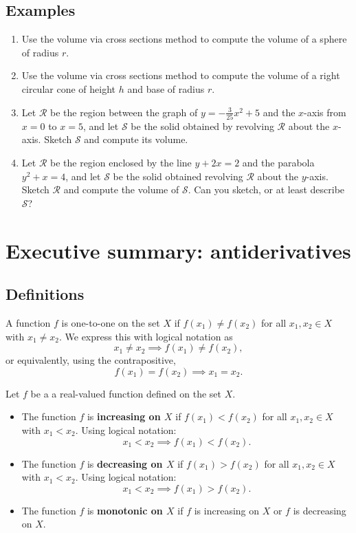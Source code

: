 \subsection*{Examples}
\begin{enumerate}
  \item Use the volume via cross sections method to compute the volume of a sphere of radius $r$.
  \item Use the volume via cross sections method to compute the volume of a right circular cone of height $h$ and base of radius $r$.
  \item Let $\mathcal{R}$ be the region between the graph of $y=-\frac{3}{25}x^2+5$ and the $x$-axis from $x=0$ to $x=5$, and let $\mathcal{S}$ be the solid obtained by revolving $\mathcal{R}$ about the $x$-axis. Sketch $\mathcal{S}$ and compute its volume.
  \item Let $\mathcal{R}$ be the region enclosed by the line $y+2x=2$ and the parabola $y^2+x=4$, and let $\mathcal{S}$ be the solid obtained revolving $\mathcal{R}$ about the $y$-axis. Sketch $\mathcal{R}$ and compute the volume of $\mathcal{S}$. Can you sketch, or at least describe $\mathcal{S}$?
\end{enumerate}




\newpage

\section{Executive summary: antiderivatives}

\thispagestyle{fancy}
\subsection*{Definitions}
\begin{namedtheorem} A function $f$ is one-to-one on the set $X$ if $f(x_1)\ne f(x_2)$ for all $x_1, x_2\in X$ with $x_1\ne x_2$. We express this with logical notation as
  \[
  x_1\ne x_2\implies f(x_1)\ne f(x_2),
\]
or equivalently, using the contrapositive,
\[
f(x_1)=f(x_2)\implies x_1=x_2.
\]
\end{namedtheorem}



\begin{namedtheorem} Let $f$ be a a real-valued function defined on the set $X$.
  \begin{itemize}
    \item The function $f$ is {\bf increasing on $X$} if $f(x_1)<f(x_2)$ for all $x_1, x_2\in X$ with $x_1<x_2$. Using logical notation:
    \[
    x_1<x_2\implies f(x_1)<f(x_2).
    \]
    \item The function $f$ is {\bf decreasing on $X$} if $f(x_1)>f(x_2)$ for all $x_1, x_2\in X$ with $x_1<x_2$. Using logical notation:
    \[
    x_1<x_2\implies f(x_1)>f(x_2).
    \]
    \item The function $f$ is {\bf monotonic on $X$} if $f$ is increasing on $X$ or $f$ is decreasing on $X$.
  \end{itemize}

\end{namedtheorem}

